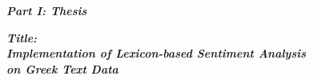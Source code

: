 
\begin{center}


\vspace*{\fill}

\textbf{\textit{\large Part I: Thesis}}

\hfill

\textbf{\textit{Title:}} \\
\textbf{\textit{\large Implementation of Lexicon-based Sentiment Analysis \\
on Greek Text Data}}

\vspace*{\fill}

\end{center}
